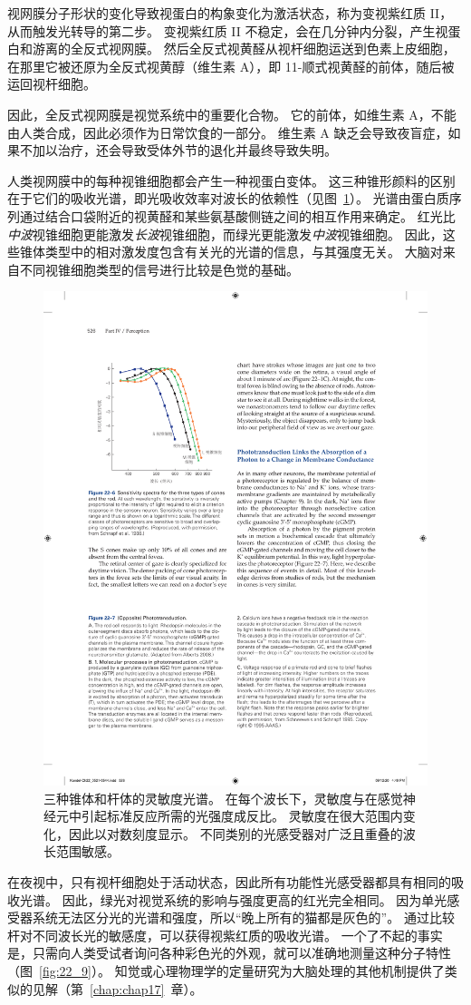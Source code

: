 视网膜分子形状的变化导致视蛋白的构象变化为激活状态，称为变视紫红质 II，从而触发光转导的第二步。
变视紫红质 II 不稳定，会在几分钟内分裂，产生视蛋白和游离的全反式视网膜。
然后全反式视黄醛从视杆细胞运送到色素上皮细胞，在那里它被还原为全反式视黄醇（维生素 A），即 11-顺式视黄醛的前体，随后被运回视杆细胞。


因此，全反式视网膜是视觉系统中的重要化合物。
它的前体，如维生素 A，不能由人类合成，因此必须作为日常饮食的一部分。
维生素 A 缺乏会导致夜盲症，如果不加以治疗，还会导致受体外节的退化并最终导致失明。


人类视网膜中的每种视锥细胞都会产生一种视蛋白变体。 
这三种锥形颜料的区别在于它们的吸收光谱，即光吸收效率对波长的依赖性（见图~\ref{fig:22_6}）。
光谱由蛋白质序列通过结合口袋附近的视黄醛和某些氨基酸侧链之间的相互作用来确定。
红光比\textit{中波}视锥细胞更能激发\textit{长波}视锥细胞，而绿光更能激发\textit{中波}视锥细胞。
因此，这些锥体类型中的相对激发度包含有关光的光谱的信息，与其强度无关。
大脑对来自不同视锥细胞类型的信号进行比较是色觉的基础。


\begin{figure}[htbp]
	\centering
	\includegraphics[width=0.55\linewidth]{chap22/fig_22_6}
	\caption{三种锥体和杆体的灵敏度光谱。 
		在每个波长下，灵敏度与在感觉神经元中引起标准反应所需的光强度成反比。 
		灵敏度在很大范围内变化，因此以对数刻度显示。 
		不同类别的光感受器对广泛且重叠的波长范围敏感。}
	\label{fig:22_6}
\end{figure}


在夜视中，只有视杆细胞处于活动状态，因此所有功能性光感受器都具有相同的吸收光谱。
因此，绿光对视觉系统的影响与强度更高的红光完全相同。
因为单光感受器系统无法区分光的光谱和强度，所以“晚上所有的猫都是灰色的”。
通过比较杆对不同波长光的敏感度，可以获得视紫红质的吸收光谱。
一个了不起的事实是，只需向人类受试者询问各种彩色光的外观，就可以准确地测量这种分子特性（图~\ref{fig:22_9}）。
知觉或心理物理学的定量研究为大脑处理的其他机制提供了类似的见解（第~\ref{chap:chap17}~章）。


